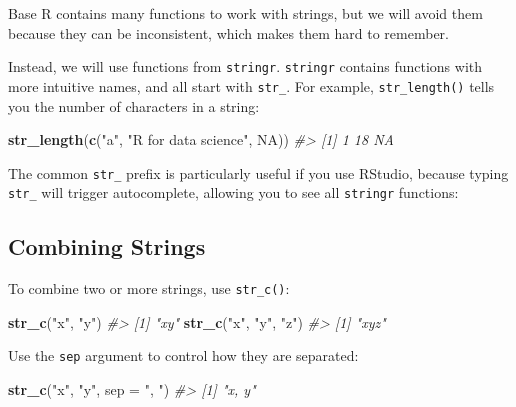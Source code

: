 \documentclass[
]{book}
\newenvironment{Shaded}{\begin{snugshade}}{\end{snugshade}}
\newcommand{\CommentTok}[1]{\textcolor[rgb]{0.56,0.35,0.01}{\textit{#1}}}
\newcommand{\DataTypeTok}[1]{\textcolor[rgb]{0.13,0.29,0.53}{#1}}
\newcommand{\KeywordTok}[1]{\textcolor[rgb]{0.13,0.29,0.53}{\textbf{#1}}}
\newcommand{\NormalTok}[1]{#1}
\newcommand{\OtherTok}[1]{\textcolor[rgb]{0.56,0.35,0.01}{#1}}
\newcommand{\StringTok}[1]{\textcolor[rgb]{0.31,0.60,0.02}{#1}}
\begin{document}
Base R contains many functions to work with strings, but we will avoid them because they can be inconsistent, which makes them hard to remember.

Instead, we will use functions from \texttt{stringr}. \texttt{stringr} contains functions with more intuitive names, and all start with \texttt{str\_}. For example, \texttt{str\_length()} tells you the number of characters in a string:

\begin{Shaded}
\begin{Highlighting}[]
\KeywordTok{str_length}\NormalTok{(}\KeywordTok{c}\NormalTok{(}\StringTok{"a"}\NormalTok{, }\StringTok{"R for data science"}\NormalTok{, }\OtherTok{NA}\NormalTok{))}
\CommentTok{#> [1]  1 18 NA}
\end{Highlighting}
\end{Shaded}

The common \texttt{str\_} prefix is particularly useful if you use RStudio, because typing \texttt{str\_} will trigger autocomplete, allowing you to see all \texttt{stringr} functions:

\hypertarget{combining-strings}{%
\subsection{Combining Strings}\label{combining-strings}}

To combine two or more strings, use \texttt{str\_c()}:

\begin{Shaded}
\begin{Highlighting}[]
\KeywordTok{str_c}\NormalTok{(}\StringTok{"x"}\NormalTok{, }\StringTok{"y"}\NormalTok{)}
\CommentTok{#> [1] "xy"}
\KeywordTok{str_c}\NormalTok{(}\StringTok{"x"}\NormalTok{, }\StringTok{"y"}\NormalTok{, }\StringTok{"z"}\NormalTok{)}
\CommentTok{#> [1] "xyz"}
\end{Highlighting}
\end{Shaded}

Use the \texttt{sep} argument to control how they are separated:

\begin{Shaded}
\begin{Highlighting}[]
\KeywordTok{str_c}\NormalTok{(}\StringTok{"x"}\NormalTok{, }\StringTok{"y"}\NormalTok{, }\DataTypeTok{sep =} \StringTok{", "}\NormalTok{)}
\CommentTok{#> [1] "x, y"}
\end{Highlighting}
\end{Shaded}
\end{document}
